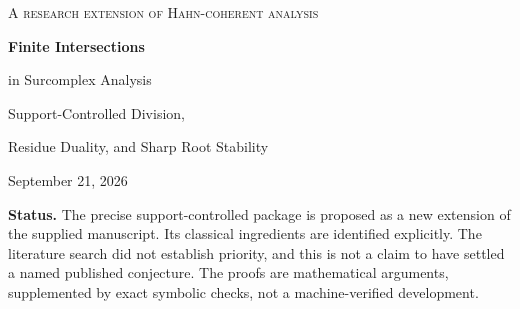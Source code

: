 \documentclass[11pt,letterpaper]{article}
\theoremstyle{definition}
\theoremstyle{remark}
\numberwithin{equation}{section}
\begin{document}
\begin{titlepage}
\centering
\vspace*{0.7cm}
{\Large\scshape A research extension of Hahn-coherent analysis\par}
\vspace{0.8cm}
{\Huge\bfseries Finite Intersections\par in Surcomplex Analysis\par}
\vspace{0.65cm}
{\LARGE Support-Controlled Division,\par Residue Duality, and Sharp Root Stability\par}
\vspace{0.8cm}
{\large September 21, 2026\par}
\vspace{0.7cm}
\begin{minipage}{0.92\textwidth}
\begin{abstract}
We develop a several-variable finite-intersection theory for holomorphic functions with well-ordered Hahn support, evaluated at surcomplex infinitesimal points. For a coupled system
\[
 F_i(s,z)=z_i^{d_i}+E_i(s,z),\qquad v_H(E_i)>0,
\]
we construct an explicit division operator on a fixed ordinary polydisk. The quotient is free of rank $N=\prod_i d_i$ over the Hahn-holomorphic parameter algebra, with the usual box monomials as a basis. An explicit contraction of the entire perturbed Koszul complex supplies both ideal-membership certificates and exact support bounds.

We prove that this algebra is the full intersection algebra of the actual surcomplex zero cluster: its local factors have the formal analytic intersection multiplicities, whose sum is exactly $N$. The associated map on an infinitesimal polydisk is surjective and finite of constant multiplicity. A coefficientwise multidimensional contour functional yields a perfect residue pairing, a B\'ezoutian reproducing kernel, the Jacobian trace formula, and residues at infinitesimally separated points.

A second theorem gives sharp valuation-scale stability. If a simple root has inverse-Jacobian loss $\kappa$, a perturbation of valuation $\sigma>2\kappa$ has a unique nearby simple root, with explicit first-order and remainder bounds; the strict threshold cannot be weakened uniformly. All infinite constructions use finite contributions at each exponent, not sequential convergence. A coupled two-variable family illustrates flat collision, discriminants, and cancellation of infinite residues.
\end{abstract}
\end{minipage}
\vfill
\begin{minipage}{0.92\textwidth}\small
\textbf{Status.} The precise support-controlled package is proposed as a new extension of the supplied manuscript. Its classical ingredients are identified explicitly. The literature search did not establish priority, and this is not a claim to have settled a named published conjecture. The proofs are mathematical arguments, supplemented by exact symbolic checks, not a machine-verified development.
\end{minipage}
\end{titlepage}
\tableofcontents
\newpage
\end{document}
